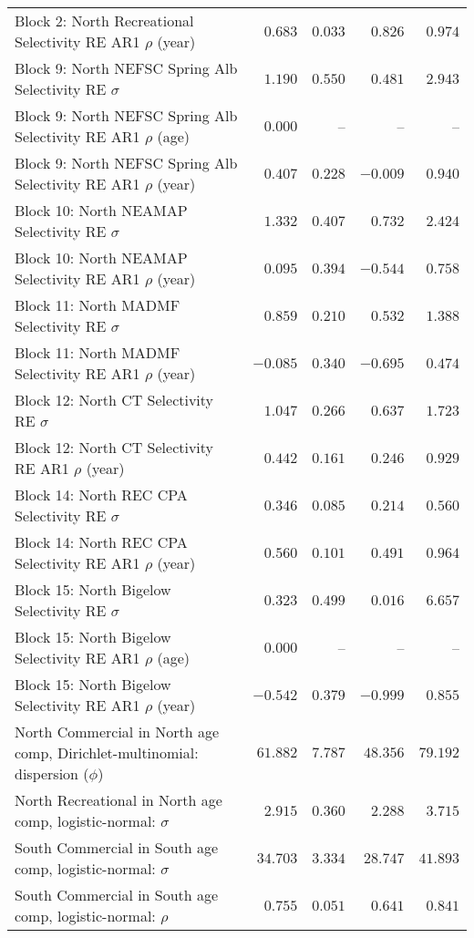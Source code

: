 \documentclass[
]{article}
\begin{document}
\begin{landscape}
\begin{longtable}[t]{lrrrr}
Block 2: North Recreational Selectivity RE AR1 $\rho$ (year) & $0.683$ & $0.033$ & $0.826$ & $0.974$\\
\addlinespace
Block 9: North NEFSC Spring Alb Selectivity RE $\sigma$ & $1.190$ & $0.550$ & $0.481$ & $2.943$\\
Block 9: North NEFSC Spring Alb Selectivity RE AR1 $\rho$ (age) & $0.000$ & -- & -- & --\\
Block 9: North NEFSC Spring Alb Selectivity RE AR1 $\rho$ (year) & $0.407$ & $0.228$ & $-0.009$ & $0.940$\\
Block 10: North NEAMAP Selectivity RE $\sigma$ & $1.332$ & $0.407$ & $0.732$ & $2.424$\\
Block 10: North NEAMAP Selectivity RE AR1 $\rho$ (year) & $0.095$ & $0.394$ & $-0.544$ & $0.758$\\
\addlinespace
Block 11: North MADMF Selectivity RE $\sigma$ & $0.859$ & $0.210$ & $0.532$ & $1.388$\\
Block 11: North MADMF Selectivity RE AR1 $\rho$ (year) & $-0.085$ & $0.340$ & $-0.695$ & $0.474$\\
Block 12: North CT Selectivity RE $\sigma$ & $1.047$ & $0.266$ & $0.637$ & $1.723$\\
Block 12: North CT Selectivity RE AR1 $\rho$ (year) & $0.442$ & $0.161$ & $0.246$ & $0.929$\\
Block 14: North REC CPA Selectivity RE $\sigma$ & $0.346$ & $0.085$ & $0.214$ & $0.560$\\
\addlinespace
Block 14: North REC CPA Selectivity RE AR1 $\rho$ (year) & $0.560$ & $0.101$ & $0.491$ & $0.964$\\
Block 15: North Bigelow Selectivity RE $\sigma$ & $0.323$ & $0.499$ & $0.016$ & $6.657$\\
Block 15: North Bigelow Selectivity RE AR1 $\rho$ (age) & $0.000$ & -- & -- & --\\
Block 15: North Bigelow Selectivity RE AR1 $\rho$ (year) & $-0.542$ & $0.379$ & $-0.999$ & $0.855$\\
North Commercial in North age comp, Dirichlet-multinomial: dispersion ($\phi$) & $61.882$ & $7.787$ & $48.356$ & $79.192$\\
\addlinespace
North Recreational in North age comp, logistic-normal: $\sigma$ & $2.915$ & $0.360$ & $2.288$ & $3.715$\\
South Commercial in South age comp, logistic-normal: $\sigma$ & $34.703$ & $3.334$ & $28.747$ & $41.893$\\
South Commercial in South age comp, logistic-normal: $\rho$ & $0.755$ & $0.051$ & $0.641$ & $0.841$\\

\end{longtable}
\end{landscape}
\end{document}
